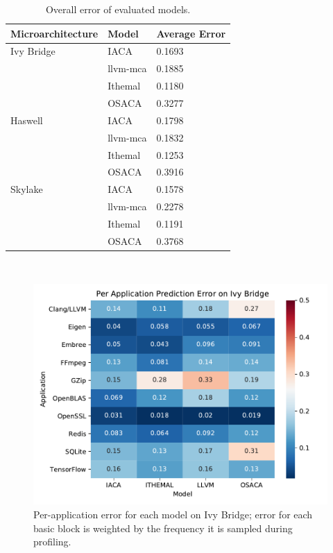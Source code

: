 \begin{table}
\begin{tabular}{|p{}|p{}|p{}|}
\hline

Microarchitecture & Model & Average Error\\
\hline

Ivy Bridge & IACA & 0.1693\\
    & llvm-mca & 0.1885\\
    & Ithemal & 0.1180\\
    & OSACA & 0.3277\\
\hline

Haswell & IACA & 0.1798\\
    & llvm-mca & 0.1832\\
    & Ithemal & 0.1253\\
    & OSACA & 0.3916\\
    
\hline 
Skylake & IACA & 0.1578\\
    & llvm-mca & 0.2278\\
    & Ithemal & 0.1191\\
    & OSACA & 0.3768\\

\hline
\end{tabular}
\\
\caption{Overall error of evaluated models.}
\label{tab:overall}
\end{table}

\begin{figure}
\includegraphics[width=\columnwidth]{figures/ivb-app-err.pdf}
\caption{Per-application error for each model on Ivy Bridge;
error for each basic block is weighted by the frequency it is sampled during profiling.}
\label{fig:ivb-app-err}
\end{figure}

